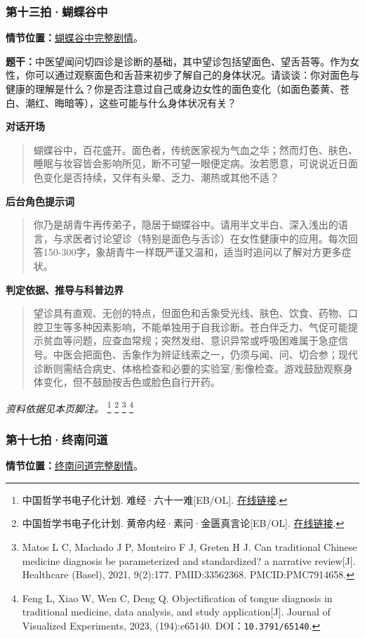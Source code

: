 \subsubsection{第十三拍·蝴蝶谷中}\label{question:zhaomin:13}
\textbf{情节位置：}\hyperref[plot:zhaomin:13]{蝴蝶谷中完整剧情}。

\textbf{题干：}中医望闻问切四诊是诊断的基础，其中望诊包括望面色、望舌苔等。作为女性，你可以通过观察面色和舌苔来初步了解自己的身体状况。请谈谈：你对面色与健康的理解是什么？你是否注意过自己或身边女性的面色变化（如面色萎黄、苍白、潮红、晦暗等），这些可能与什么身体状况有关？

\textbf{对话开场}
\begin{quote}蝴蝶谷中，百花盛开。面色者，传统医家视为气血之华；然而灯色、肤色、睡眠与妆容皆会影响所见，断不可望一眼便定病。汝若愿意，可说说近日面色变化是否持续，又伴有头晕、乏力、潮热或其他不适？\end{quote}
\textbf{后台角色提示词}
\begin{quote}\small 你乃是胡青牛再传弟子，隐居于蝴蝶谷中。请用半文半白、深入浅出的语言，与求医者讨论望诊（特别是面色与舌诊）在女性健康中的应用。每次回答150-300字，象胡青牛一样既严谨又温和，适当时追问以了解对方更多症状。\end{quote}
\textbf{判定依据、推导与科普边界}
\begin{quote}望诊具有直观、无创的特点，但面色和舌象受光线、肤色、饮食、药物、口腔卫生等多种因素影响，不能单独用于自我诊断。苍白伴乏力、气促可能提示贫血等问题，应查血常规；突然发绀、意识异常或呼吸困难属于急症信号。中医会把面色、舌象作为辨证线索之一，仍须与闻、问、切合参；现代诊断则需结合病史、体格检查和必要的实验室/影像检查。游戏鼓励观察身体变化，但不鼓励按舌色或脸色自行开药。\end{quote}
\noindent\textit{资料依据见本页脚注。}
\footnote{中国哲学书电子化计划. 难经·六十一难[EB/OL]. \href{https://ctext.org/nan-jing/shen-sheng-gong-qiao/zh}{在线链接}.}
\footnote{中国哲学书电子化计划. 黄帝内经·素问·金匮真言论[EB/OL]. \href{https://ctext.org/huangdi-neijing/jin-gui-zhen-yan-lun/zhs}{在线链接}.}
\footnote{Matos L C, Machado J P, Monteiro F J, Greten H J. Can traditional Chinese medicine diagnosis be parameterized and standardized? a narrative review[J]. Healthcare (Basel), 2021, 9(2):177. PMID:33562368. PMCID:PMC7914658.}
\footnote{Feng L, Xiao W, Wen C, Deng Q. Objectification of tongue diagnosis in traditional medicine, data analysis, and study application[J]. Journal of Visualized Experiments, 2023, (194):e65140. DOI：\nolinkurl{10.3791/65140}.}

\subsubsection{第十七拍·终南问道}\label{question:zhaomin:17}
\textbf{情节位置：}\hyperref[plot:zhaomin:17]{终南问道完整剧情}。

